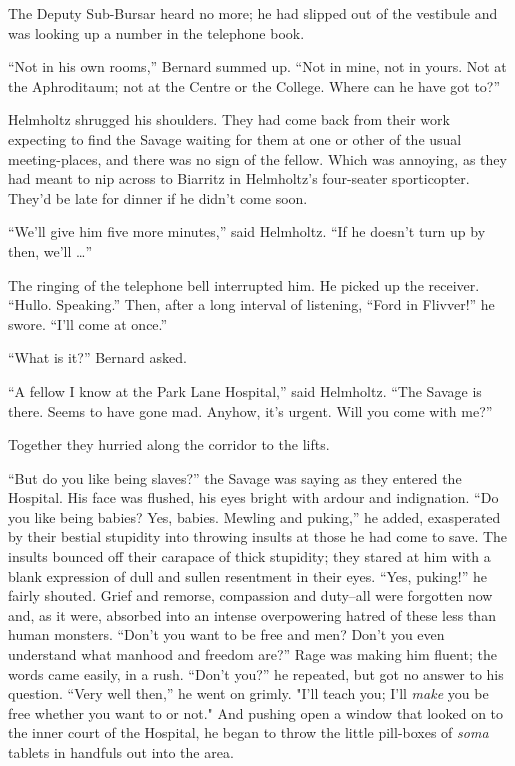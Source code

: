 \documentclass[12pt]{report}
\begin{document}
The Deputy Sub-Bursar heard no more; he had slipped out of the vestibule
and was looking up a number in the telephone book.

``Not in his own rooms,'' Bernard summed up. ``Not in mine, not in
yours. Not at the Aphroditaum; not at the Centre or the College. Where
can he have got to?''

Helmholtz shrugged his shoulders. They had come back from their work
expecting to find the Savage waiting for them at one or other of the
usual meeting-places, and there was no sign of the fellow. Which was
annoying, as they had meant to nip across to Biarritz in Helmholtz's
four-seater sporticopter. They'd be late for dinner if he didn't come
soon.

``We'll give him five more minutes,'' said Helmholtz. ``If he doesn't
turn up by then, we'll \ldots{}''

The ringing of the telephone bell interrupted him. He picked up the
receiver. ``Hullo. Speaking.'' Then, after a long interval of listening,
``Ford in Flivver!'' he swore. ``I'll come at once.''

``What is it?'' Bernard asked.

``A fellow I know at the Park Lane Hospital,'' said Helmholtz. ``The
Savage is there. Seems to have gone mad. Anyhow, it's urgent. Will you
come with me?''

Together they hurried along the corridor to the lifts.

``But do you like being slaves?'' the Savage was saying as they entered
the Hospital. His face was flushed, his eyes bright with ardour and
indignation. ``Do you like being babies? Yes, babies. Mewling and
puking,'' he added, exasperated by their bestial stupidity into throwing
insults at those he had come to save. The insults bounced off their
carapace of thick stupidity; they stared at him with a blank expression
of dull and sullen resentment in their eyes. ``Yes, puking!'' he fairly
shouted. Grief and remorse, compassion and duty--all were forgotten now
and, as it were, absorbed into an intense overpowering hatred of these
less than human monsters. ``Don't you want to be free and men? Don't you
even understand what manhood and freedom are?'' Rage was making him
fluent; the words came easily, in a rush. ``Don't you?'' he repeated,
but got no answer to his question. ``Very well then,'' he went on
grimly. "I'll teach you; I'll \emph{make} you be free whether you want
to or not." And pushing open a window that looked on to the inner court
of the Hospital, he began to throw the little pill-boxes of \emph{soma}
tablets in handfuls out into the area.
\end{document}
